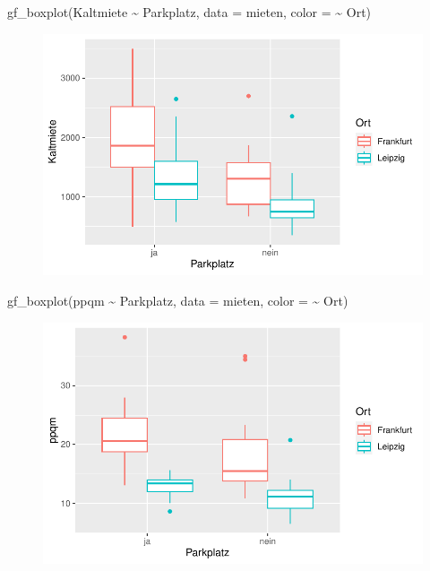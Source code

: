 \documentclass[
  a4paper,
  DIV=11]{scrartcl}
\newenvironment{Shaded}{\begin{snugshade}}{\end{snugshade}}
\newcommand{\AttributeTok}[1]{\textcolor[rgb]{0.40,0.45,0.13}{#1}}
\newcommand{\FunctionTok}[1]{\textcolor[rgb]{0.28,0.35,0.67}{#1}}
\newcommand{\NormalTok}[1]{\textcolor[rgb]{0.00,0.23,0.31}{#1}}
\newcommand{\SpecialCharTok}[1]{\textcolor[rgb]{0.37,0.37,0.37}{#1}}
\begin{document}
\begin{Shaded}
\begin{Highlighting}[]
\FunctionTok{gf\_boxplot}\NormalTok{(Kaltmiete }\SpecialCharTok{\textasciitilde{}}\NormalTok{ Parkplatz, }\AttributeTok{data =}\NormalTok{ mieten, }\AttributeTok{color =} \SpecialCharTok{\textasciitilde{}}\NormalTok{ Ort)}
\end{Highlighting}
\end{Shaded}

\begin{figure}[H]

{\centering \includegraphics{Mietmodellierung_files/figure-pdf/unnamed-chunk-18-1.pdf}

}

\end{figure}

\begin{Shaded}
\begin{Highlighting}[]
\FunctionTok{gf\_boxplot}\NormalTok{(ppqm }\SpecialCharTok{\textasciitilde{}}\NormalTok{ Parkplatz, }\AttributeTok{data =}\NormalTok{ mieten, }\AttributeTok{color =} \SpecialCharTok{\textasciitilde{}}\NormalTok{ Ort)}
\end{Highlighting}
\end{Shaded}

\begin{figure}[H]

{\centering \includegraphics{Mietmodellierung_files/figure-pdf/unnamed-chunk-18-2.pdf}

}

\end{figure}
\end{document}
